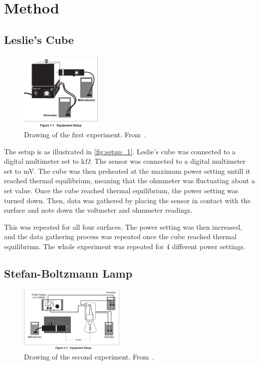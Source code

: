 \documentclass[5p,sort&compress]{elsarticle}
\begin{document}
\section{Method}
\subsection{Leslie's Cube}
\begin{figure}[h]
    \centering
    \includegraphics[width=0.35\textwidth]{../setup_1.png}
    \caption{Drawing of the first experiment. From~\cite{pasco}.}
    \label{fig:setup_1}
\end{figure}

The setup is as illustrated in \autoref{fig:setup_1}. Leslie's cube was connected to a digital multimeter set to k$\Omega$. The sensor was connected to a digital multimeter set to mV. The cube was then preheated at the maximum power setting untill it reached thermal equilibrium, meaning that the ohmmeter was fluctuating about a set value. Once the cube reached thermal equilibrium, the power setting was turned down. Then, data was gathered by placing the sensor in contact with the surface and note down the voltmeter and ohmmeter readings. 

This was repeated for all four surfaces. The power setting was then increased, and the data gathering process was repeated once the cube reached thermal equilibrium. The whole experiment was repeated for 4 different power settings. 

\subsection{Stefan-Boltzmann Lamp}
\begin{figure}[h]
    \centering
    \includegraphics[width=0.45\textwidth]{../setup_2.png}
    \caption{Drawing of the second experiment. From~\cite{pasco}.}
    \label{fig:setup_2}
\end{figure}
\end{document}
